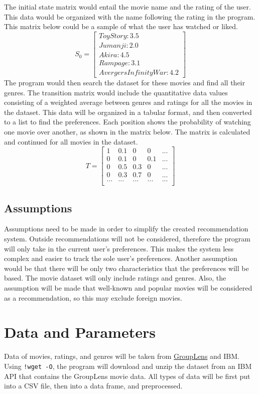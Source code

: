 \documentclass{article}
\begin{document}
The initial state matrix would entail the movie name and the rating of the user. This data would be organized with the name following 
the rating in the program. This matrix below could be a sample
of what the user has watched or liked.
$$
S_0 =
\begin{bmatrix}
Toy Story:3.5 \\
Jumanji:2.0 \\
Akira:4.5 \\
Rampage:3.1 \\
Avergers Infinity War: 4.2
\end{bmatrix}
$$
    The program would then search the dataset for these movies and find all their genres. The transition matrix would include the 
quantitative data values consisting of a weighted average between genres and ratings for all the movies in the dataset. This data will be 
organized in a tabular format, and then converted to a list to find the preferences. Each position shows the probability of watching one 
movie over another, as shown in the matrix below. The matrix is calculated and continued for all movies in the dataset.
$$
T =
\begin{bmatrix}
1 & 0.1 & 0 & 0 & ...\\
0 & 0.1 & 0 & 0.1 & ...\\
0 & 0.5 & 0.3 & 0 & ...\\
0 & 0.3 & 0.7 & 0 & ...\\
... & ... & ... & ... & ...\\
\end{bmatrix}
$$ 

\subsection{Assumptions}
Assumptions need to be made in order to simplify the created recommendation system. Outside recommendations will not be considered, therefore the program will only take in 
the current user's preferences. This makes the system less complex and easier to track the sole user's preferences. 
Another assumption would be that there will be only two characteristics that the preferences will be based. The movie dataset will only include ratings and 
genres. Also, the assumption will be made that well-known and popular movies will be considered as a recommendation, so this may exclude foreign movies.


\section{Data and Parameters}
Data of movies, ratings, and genres will be taken from \href{http://grouplens.org/datasets/movielens/}{GroupLens} and IBM.  Using \verb|!wget -O|, the program will 
download and unzip the dataset from an IBM API that contains the GroupLens movie data. All types of data will be 
first put into a CSV file, then into a data frame, and preprocessed.\\
\end{document}

